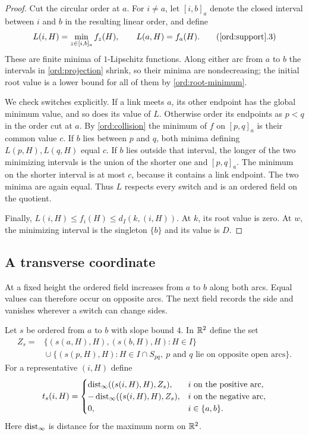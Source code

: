 \begin{proof}
Cut the circular order at $a$. For $i\ne a$, let $[i,b]_a$ denote
the closed interval between $i$ and $b$ in the resulting linear
order, and define
\[
 L(i,H)=\min_{z\in[i,b]_a} f_z(H),\qquad
 L(a,H)=f_a(H).
\tag{\ref{ord:support}.3}\label{ord:projection}
\]
These are finite minima of $1$-Lipschitz functions. Along either
arc from $a$ to $b$ the intervals in \eqref{ord:projection} shrink,
so their minima are nondecreasing; the initial root value is a
lower bound for all of them by \eqref{ord:root-minimum}.

We check switches explicitly. If a link meets $a$, its other
endpoint has the global minimum value, and so does its value of
$L$. Otherwise order its endpoints as $p<q$ in the order cut at
$a$. By \eqref{ord:collision} the minimum of $f$ on $[p,q]_a$ is
their common value $c$. If $b$ lies between $p$ and $q$, both
minima defining $L(p,H),L(q,H)$ equal $c$. If $b$ lies outside
that interval, the longer of the two minimizing intervals is the
union of the shorter one and $[p,q]_a$. The minimum on the
shorter interval is at most $c$, because it contains a link
endpoint. The two minima are again equal. Thus $L$ respects
every switch and is an ordered field on the quotient.

Finally, $L(i,H)\le f_i(H)\le d_I(k,(i,H))$. At $k$, its
root value is zero. At $w$, the minimizing interval is the
singleton $\{b\}$ and its value is $D$.
\end{proof}

\subsection{A transverse coordinate}

At a fixed height the ordered field increases from $a$ to $b$ along both
arcs. Equal values can therefore occur on opposite arcs. The next field
records the side and vanishes wherever a switch can change sides.

\begin{definition}\label{ord:transverse-definition}
Let $s$ be ordered from $a$ to $b$ with slope bound $4$. In
$\mathbb R^2$ define the set
\[
 \begin{split}
 Z_s={}&\{(s(a,H),H),(s(b,H),H):H\in I\}\\
 &{}\cup\{(s(p,H),H): H\in I\cap S_{pq},\
     p\text{ and }q\text{ lie on opposite open arcs}\}.
 \end{split}
\]
For a representative $(i,H)$ define
\[
 t_s(i,H)=
 \begin{cases}
  \operatorname{dist}_\infty((s(i,H),H),Z_s),&i\text{ on the positive arc},\\
  -\operatorname{dist}_\infty((s(i,H),H),Z_s),&i\text{ on the negative arc},\\
  0,&i\in\{a,b\}.
 \end{cases}
\]
Here $\operatorname{dist}_\infty$ is distance for the maximum norm on $\mathbb R^2$.
\end{definition}

